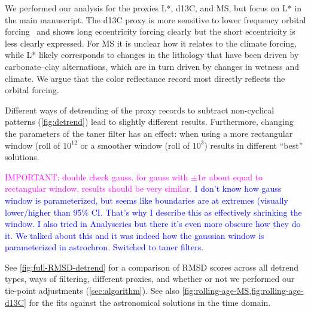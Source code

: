 \documentclass[draft]{agujournal2019}
\newcommand{\rez}{\textcolor{magenta}}
\newcommand{\ijk}{\textcolor{blue}}
\begin{document}
We performed our analysis for the proxies \gls{L*}, \gls{d13C}, and \gls{MS}, but  focus on \gls{L*} in the main manuscript.
The \gls{d13C} proxy is more sensitive to lower frequency orbital forcing~\cite{Zeebe2017,Kocken2019loscar} and shows long eccentricity forcing clearly but the short eccentricity is less clearly expressed.
For \gls{MS} it is unclear how it relates to the climate forcing, %
while \gls{L*} likely corresponds to changes in the lithology that have been driven by carbonate--clay alternations, which are in turn driven by changes in wetness and climate.
We argue that the color reflectance record most directly reflects the orbital forcing.

Different ways of detrending of the proxy records to subtract non-cyclical patterns (\cref{fig:detrend}) lead to slightly different results.
Furthermore, changing the parameters of the taner filter has an effect: when using a more rectangular window (roll of \(10^{12}\) or a smoother window (roll of \(10^{3}\)) results in different ``best'' solutions.

\rez{IMPORTANT: double check gauss. for gauss with $\pm 1 \sigma$ about equal to rectangular window, results should be very similar.}
\ijk{I don't know how gauss window is parameterized, but seems like boundaries are at extremes (visually lower/higher than 95\% CI. That's why I describe this as effectively shrinking the window. I also tried in Analyseries but there it's even more obscure how they do it.}
\ijk{We talked about this and it was indeed how the gaussian window is parameterized in astrochron. Switched to taner filters.}

See \cref{fig:full-RMSD-detrend} for a comparison of \gls{RMSD} scores across all detrend types, ways of filtering, different proxies, and whether or not we performed our tie-point adjustments (\cref{sec:algorithm}).
See also \cref{fig:rolling-age-MS,fig:rolling-age-d13C} for the fits against the astronomical solutions in the time domain.
\end{document}
